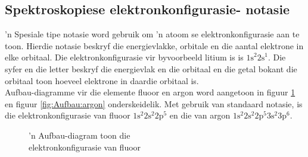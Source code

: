 \subsection*{Spektroskopiese elektronkonfigurasie- notasie}
        \label{m38741*id259749}
 'n Spesiale tipe notasie word gebruik om 'n atoom se elektronkonfigurasie aan te toon. Hierdie notasie beskryf die energievlakke, orbitale en die aantal elektrone in elke orbitaal. Die elektronkonfigurasie vir byvoorbeeld litium is is ${1\text{s}}^{2}{2\text{s}}^{1}$. Die syfer en die letter beskryf die energievlak en die orbitaal en die getal bokant die orbitaal toon hoeveel elektrone in daardie orbitaal is.\\
Aufbau-diagramme vir die elemente fluoor en argon word aangetoon in figuur \ref{fig:Aufbau:fluorine} en figuur \ref{fig:Aufbau:argon} onderskeidelik. Met gebruik van standaard notasie, is die elektronkonfigurasie van fluoor $1\text{s}^{2}{2}\text{s}^{2}2\text{p}^{5}$ en die van argon $1\text{s}^{2}{2}\text{s}^{2}2\text{p}^{5}{3}\text{s}^{2}3\text{p}^{6}$.\\
\begin{minipage}{.5\textwidth}
\begin{figure}[H]
\begin{center}

\caption{ 'n Aufbau-diagram toon die \\  elektronkonfigurasie van fluoor}
\label{fig:Aufbau:fluorine}
\end{center}
\end{figure}
\end{minipage}
